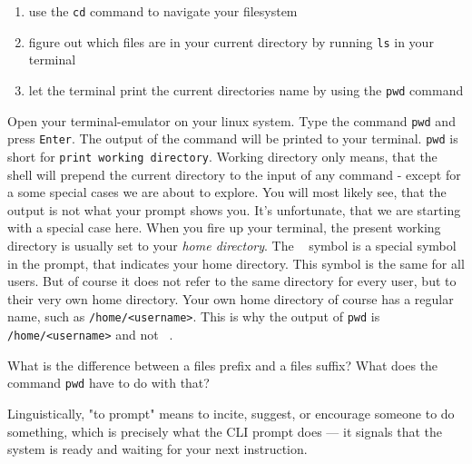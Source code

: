 \begin{challenge}
\begin{chadescription}
    \begin{enumerate}
        \item use the \texttt{cd} command to navigate your filesystem
        \item figure out which files are in your current directory by running \texttt{ls} in your terminal
        \item let the terminal print the current directories name by using the \texttt{pwd} command
    \end{enumerate}
    \end{chadescription}

    \begin{task}
    Open your terminal-emulator on your linux system.
    Type the command \texttt{pwd} and press \texttt{Enter}.
    The output of the command will be printed to your terminal.
    \texttt{pwd} is short for \texttt{print working directory}.
    Working directory only means, that the shell will prepend the current directory to the input of any command - except for a some special cases we are about to explore.
    You will most likely see, that the output is not what your prompt shows you. 
    It's unfortunate, that we are starting with a special case here.
    When you fire up your terminal, the present working directory is usually set to your \textit{home directory}.
    The \texttt{~} symbol is a special symbol in the prompt, that indicates your home directory.
    This symbol is the same for all users. 
    But of course it does not refer to the same directory for every user, but to their very own home directory.
    Your own home directory of course has a regular name, such as \texttt{/home/<username>}.
    This is why the output of \texttt{pwd} is \texttt{/home/<username>} and not \texttt{~}.
    \begin{questions}
        \item What is the difference between a files prefix and a files suffix? What does the command \texttt{pwd} have to do with that?
    \end{questions}
    \end{task}
    \begin{advice}
        Linguistically, "to prompt" means to incite, suggest, or encourage someone to do something, which is precisely what the CLI prompt does — it signals that the system is ready and waiting for your next instruction.
    \end{advice}


\end{challenge}
